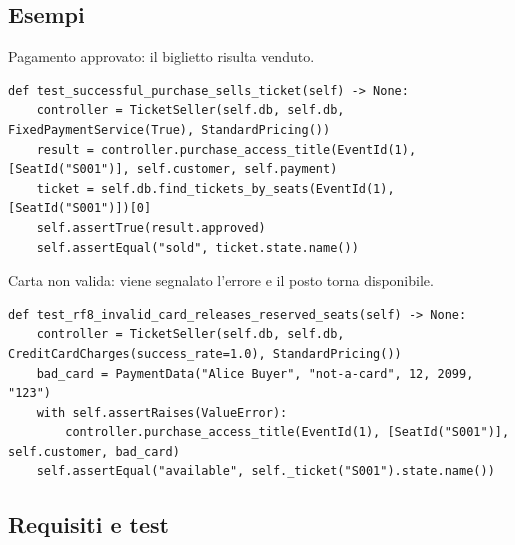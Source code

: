 \subsection{Esempi}

Pagamento approvato: il biglietto risulta venduto.

\par\noindent\begin{minipage}{\linewidth}
\begin{lstlisting}
def test_successful_purchase_sells_ticket(self) -> None:
    controller = TicketSeller(self.db, self.db, FixedPaymentService(True), StandardPricing())
    result = controller.purchase_access_title(EventId(1), [SeatId("S001")], self.customer, self.payment)
    ticket = self.db.find_tickets_by_seats(EventId(1), [SeatId("S001")])[0]
    self.assertTrue(result.approved)
    self.assertEqual("sold", ticket.state.name())
\end{lstlisting}
\end{minipage}\par

Carta non valida: viene segnalato l'errore e il posto torna disponibile.

\par\noindent\begin{minipage}{\linewidth}
\begin{lstlisting}
def test_rf8_invalid_card_releases_reserved_seats(self) -> None:
    controller = TicketSeller(self.db, self.db, CreditCardCharges(success_rate=1.0), StandardPricing())
    bad_card = PaymentData("Alice Buyer", "not-a-card", 12, 2099, "123")
    with self.assertRaises(ValueError):
        controller.purchase_access_title(EventId(1), [SeatId("S001")], self.customer, bad_card)
    self.assertEqual("available", self._ticket("S001").state.name())
\end{lstlisting}
\end{minipage}\par

\subsection{Requisiti e test}

